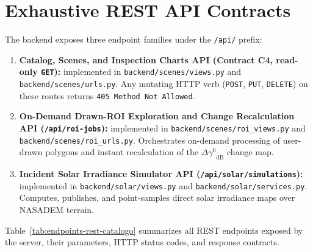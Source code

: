 \documentclass[11pt,a4paper]{article}
\newcommand{\src}[1]{\nolinkurl{#1}}
\newcommand{\gz}{\ensuremath{\gamma^{0}}}
\begin{document}
\section{Exhaustive REST API Contracts}
\label{sec:arq-apis-rest}

The backend exposes three endpoint families under the \texttt{/api/} prefix:
\begin{enumerate}
  \item \textbf{Catalog, Scenes, and Inspection Charts API (Contract C4, read-only \texttt{GET}):}
        implemented in \src{backend/scenes/views.py} and \src{backend/scenes/urls.py}. Any mutating HTTP verb
        (\texttt{POST}, \texttt{PUT}, \texttt{DELETE}) on these routes returns \texttt{405 Method Not Allowed}.
  \item \textbf{On-Demand Drawn-ROI Exploration and Change Recalculation API (\texttt{/api/roi-jobs}):}
        implemented in \src{backend/scenes/roi\_views.py} and \src{backend/scenes/roi\_urls.py}. Orchestrates
        on-demand processing of user-drawn polygons and instant recalculation of the
        $\Delta\gz_{\mathrm{dB}}$ change map.
  \item \textbf{Incident Solar Irradiance Simulator API (\texttt{/api/solar/simulations}):}
        implemented in \src{backend/solar/views.py} and \src{backend/solar/services.py}. Computes, publishes,
        and point-samples direct solar irradiance maps over NASADEM terrain.
\end{enumerate}

Table~\ref{tab:endpoints-rest-catalogo} summarizes all REST endpoints exposed by the server, their parameters,
HTTP status codes, and response contracts.
\end{document}
